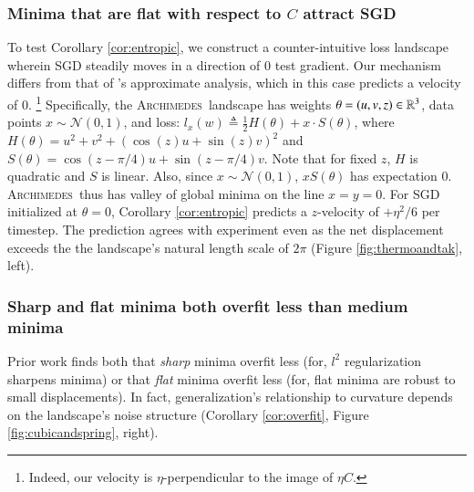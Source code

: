 \documentclass{article}
\theoremstyle{plain}
\theoremstyle{definition}
\newcommand{\Nn}{\mathcal{N}}   \newcommand{\NN}{\mathbb{N}}
\newcommand{\Archimedes}{\textsc{Archimedes}}
\begin{document}

    \subsubsection{Minima that are flat with respect to $C$ attract SGD} \label{subsect:entropic}
        To test Corollary \ref{cor:entropic}, we construct a counter-intuitive
        loss landscape wherein SGD steadily moves in a direction of $0$ test
        gradient.  Our mechanism differs from that of \cite{ch18}'s approximate
        analysis, which in this case predicts a velocity of $0$.%
        \footnote{
            Indeed, our velocity is $\eta$-perpendicular to the image of $\eta
            C$.
        }
        Specifically, the \Archimedes\ landscape has
        weights     $\theta = (u,v,z) \in \mathbb{R}^3$,
        data points $x \sim \Nn(0, 1)$,
        and loss:
        $
            l_x(w)
            \triangleq
            \frac{1}{2} H(\theta) + x \cdot S(\theta)
        $,
        where $H(\theta) = u^2 + v^2 + (\cos(z) u + \sin(z) v)^2$
        and   $S(\theta) = \cos(z-\pi/4) u + \sin(z-\pi/4) v$.
        Note that for fixed $z$, $H$ is quadratic and $S$ is linear.  Also,
        since $x \sim \Nn(0,1)$, $x S(\theta)$ has expectation $0$.
        \Archimedes\ thus has valley of global minima on the line $x=y=0$. 
        For SGD initialized at $\theta=0$, Corollary \ref{cor:entropic}
        predicts a $z$-velocity of $+\eta^2/6$ per timestep.  The prediction
        agrees with experiment even as the net displacement exceeds the 
        the landscape's natural length scale of $2\pi$ (Figure
        \ref{fig:thermoandtak}, left).


    \subsubsection{Sharp and flat minima both overfit less than medium minima} \label{subsect:overfit}

        Prior work finds both that \emph{sharp} minima overfit less (for, $l^2$
        regularization sharpens minima) or that \emph{flat} minima overfit less
        (for, flat minima are robust to small displacements).  In fact,
        generalization's relationship to curvature depends on the landscape's
        noise structure (Corollary \ref{cor:overfit}, Figure
        \ref{fig:cubicandspring}, right).
        
\end{document}
